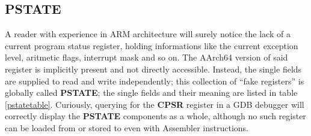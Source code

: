 \documentclass[12pt,a4paper,openright,twoside]{report}
\begin{document}
\subsection{PSTATE}
A reader with experience in ARM architecture will surely notice the lack of a
current program status register, holding informations like the current exception
level, aritmetic flags, interrupt mask and so on.
The AArch64 version of said register is implicitly present and not directly 
accessible. Instead, the single fields are supplied to read and
write independently; this collection of ``fake registers'' is globally called 
\textbf{PSTATE}; the single fields and their meaning are listed in table \ref{pstatetable}.
 Curiously, querying for the \textbf{CPSR} register in a GDB 
debugger will correctly display the \textbf{PSTATE} components as a whole, although
no such register can be loaded from or stored to even with Assembler instructions.
\end{document}
